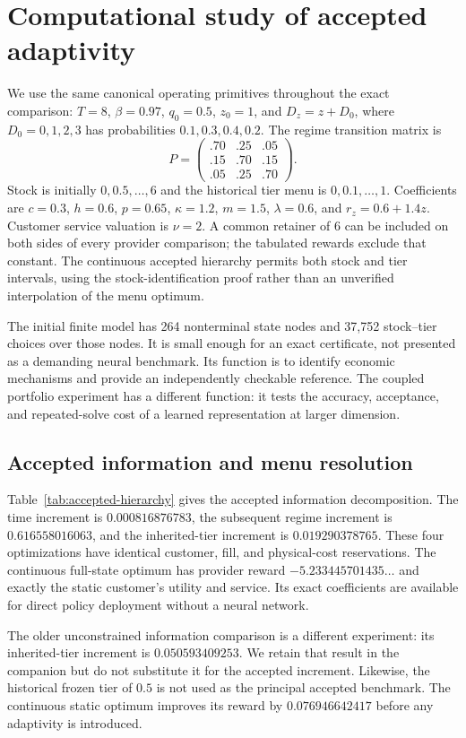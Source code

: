 \section{Computational study of accepted adaptivity}\label{sec:study}
We use the same canonical operating primitives throughout the exact comparison: $T=8$, $\beta=0.97$, $q_0=0.5$, $z_0=1$, and $D_z=z+D_0$, where $D_0=0,1,2,3$ has probabilities $0.1,0.3,0.4,0.2$. The regime transition matrix is
\[
 P=\begin{pmatrix}.70&.25&.05\\.15&.70&.15\\.05&.25&.70\end{pmatrix}.
\]
Stock is initially $0,0.5,\ldots,6$ and the historical tier menu is $0,0.1,\ldots,1$. Coefficients are $c=0.3$, $h=0.6$, $p=0.65$, $\kappa=1.2$, $m=1.5$, $\lambda=0.6$, and $r_z=0.6+1.4z$. Customer service valuation is $\nu=2$. A common retainer of 6 can be included on both sides of every provider comparison; the tabulated rewards exclude that constant. The continuous accepted hierarchy permits both stock and tier intervals, using the stock-identification proof rather than an unverified interpolation of the menu optimum.

The initial finite model has 264 nonterminal state nodes and 37,752 stock--tier choices over those nodes. It is small enough for an exact certificate, not presented as a demanding neural benchmark. Its function is to identify economic mechanisms and provide an independently checkable reference. The coupled portfolio experiment has a different function: it tests the accuracy, acceptance, and repeated-solve cost of a learned representation at larger dimension.

\subsection{Accepted information and menu resolution}
Table~\ref{tab:accepted-hierarchy} gives the accepted information decomposition. The time increment is $0.000816876783$, the subsequent regime increment is $0.616558016063$, and the inherited-tier increment is $0.019290378765$. These four optimizations have identical customer, fill, and physical-cost reservations. The continuous full-state optimum has provider reward $-5.233445701435\ldots$ and exactly the static customer's utility and service. Its exact coefficients are available for direct policy deployment without a neural network.

The older unconstrained information comparison is a different experiment: its inherited-tier increment is $0.050593409253$. We retain that result in the companion but do not substitute it for the accepted increment. Likewise, the historical frozen tier of $0.5$ is not used as the principal accepted benchmark. The continuous static optimum improves its reward by $0.076946642417$ before any adaptivity is introduced.

